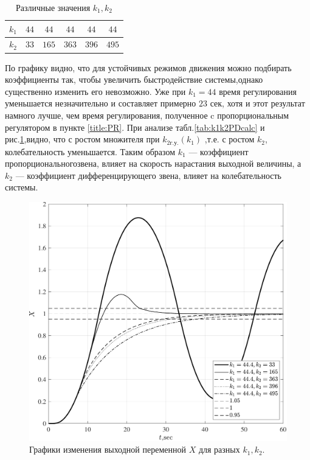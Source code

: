 \begin{table}[!h] \centering
    \caption{Различные значения $k_1,k_2$} \label{tab:k1k2PD}
    \begin{tabular}{|c|c|c|c|c|c|}
        \hline
        $k_1$& $44$& $44$& $44$& $44$& $44$ \\ \hline
        $k_2$& $33$& $165$& $363$& $396$& $495$ \\ \hline
    \end{tabular}
\end{table}
По графику видно, что для устойчивых режимов движения можно подбирать коэффициенты так, чтобы увеличить быстродействие системы,однако существенно изменить его невозможно. Уже при $k_1=44$ время регулирования уменьшается незначительно и составляет примерно $23$ сек, хотя и этот результат намного лучше, чем время регулирования, полученное c пропорциональным регулятором в пункте \ref{title:PR}. При анализе табл.\ref{tab:k1k2PDcalc} и рис.\ref{fig:PD_sys},видно, что с ростом множителя при $k_{2\text{г.у.}}(k_1)$ ,т.е. с ростом $k_2$, колебательность уменьшается. Таким образом $k_1$ --- коэффициент пропорциональногозвена, влияет на скорость нарастания выходной величины, а $k_2$ --- коэффициент дифференцирующего звена, влияет на колебательность системы.
\begin{figure}[!h]\centering
\includegraphics[width=1.0\linewidth]{images/PD_sys}
\caption{ Графики изменения выходной переменной $X$ для разных $k_1,k_2$.}\label{fig:PD_sys}
\end{figure}
